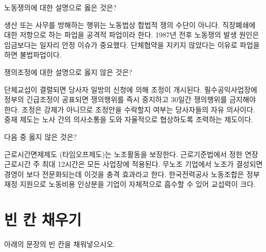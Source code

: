 \documentclass[11pt,answers]{exam} %
\begin{document}
\begin{questions}
\question[2] 노동쟁의에 대한 설명으로 옳은 것은?
    \begin{choices}
    \choice\relax 생산 또는 사무를 방해하는 행위는 노동법상 합법적 쟁의 수단이 아니다.
    \choice\relax 직장폐쇄에 대한 저항으로 하는 파업을 공격적 파업이라 한다.
    \choice\relax 1987년 전후 노동쟁의 발생 원인은 임금보다는 일자리 안정 이슈가 중요했다.
    \CorrectChoice\relax 단체협약을 지키지 않았다는 이유로 파업을 하면 불법파업이다.
    \end{choices}

\question[2] 쟁의조정에 대한 설명으로 옳지 않은 것은?
    \begin{choices}
    \choice\relax 단체교섭이 결렬되면 당사자 일방의 신청에 의해 조정이 개시된다.
    \choice\relax 필수공익사업장에 정부의 긴급조정이 공표되면 쟁의행위를 즉시 중지하고 30일간 쟁의행위를 금지해야 한다.
    \choice\relax 조정은 강제가 아니므로 조정안을 수락할지 여부는 당사자들의 자유 의사이다.
    \CorrectChoice\relax 중재 제도는 노사 간의 의사소통을 도와 자율적으로 협상하도록 조력하는 제도이다.
    \end{choices}

\question[2] 다음 중 옳지 않은 것은?
    \begin{choices}
    \choice\relax 근로시간면제제도 (타임오프제도)는 노조활동을 보장한다.
    \CorrectChoice\relax 근로기준법에서 정한 연장근로시간 주 최대 12시간은 모든 사업장에 적용된다.
    \choice\relax 무노조 기업에서 노조가 결성되면 경영이 보다 전문화되는데 이것을 충격 효과라고 한다.
    \choice\relax 한국전력공사 노동조합은 정부 재정 지원으로 노동비용 인상분을 기업이 자체적으로 흡수할 수 있어 교섭력이 크다.
    \end{choices}


\section*{빈 칸 채우기}
아래의 문장의 빈 칸을 채워넣으시오.


\end{questions}
\end{document}
